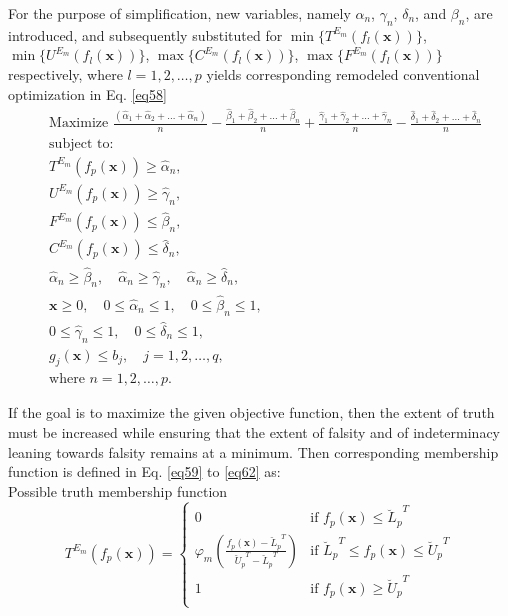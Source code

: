 \documentclass[a4paper]{elsarticle}
\begin{document}
{\begin{equation}
\end{equation}
For the purpose of simplification, new variables, namely $\alpha_n$, $\gamma_n$, $\delta_n$, and $\beta_n$, are introduced, and subsequently substituted for $\min\{T^{E_m}(f_l{(\mathbf{x})})\}$, $\min\{U^{E_m}(f_l{(\mathbf{x})})\}$, $\max\{C^{E_m}(f_l{(\mathbf{x})})\}$, $\max\{F^{E_m}(f_l{(\mathbf{x})})\}$  respectively, where $l=1,2,\ldots, p$ yields corresponding remodeled conventional optimization in Eq. \ref{eq58}
\begin{equation}
\label{eq58}
\begin{aligned}
&\text{Maximize } \frac{(\hat{\alpha}_1+\hat{\alpha}_2+\ldots+\hat{\alpha}_n)}{n}-\frac{\hat{\beta}_1+\hat{\beta}_2+\ldots+\hat{\beta}_n}{n}+\frac{\hat{\gamma}_1+\hat{\gamma}_2+\ldots+\hat{\gamma}_n}{n}-\frac{\hat{\delta}_1+\hat{\delta}_2+\ldots+\hat{\delta}_n}{n} \\
&\text{subject to:} \\
&T^{E_m}(f_p(\mathbf{x}))\geq \hat{\alpha}_n, \\
&U^{E_m}(f_p(\mathbf{x}))\geq \hat{\gamma}_n, \\
&F^{E_m}(f_p(\mathbf{x}))\leq \hat{\beta}_n, \\
&C^{E_m}(f_p(\mathbf{x}))\leq \hat{\delta}_n, \\
&\hat{\alpha}_n\geq \hat{\beta}_n, \quad \hat{\alpha}_n\geq\hat{\gamma}_n, \quad \hat{\alpha}_n\geq \hat{\delta}_n, \\
&\mathbf{x} \geq 0, \quad 0 \leq \hat{\alpha}_n \leq 1, \quad 0\leq \hat{\beta}_n \leq 1, \\
&0\leq \hat{\gamma}_n \leq 1, \quad 0\leq \hat{\delta}_n \leq 1, \\
&{g}_j(\mathbf{x})\leq {b}_{j}, \quad j=1,2,\ldots, q, \\
&\text{where } n=1,2,\ldots,p.
\end{aligned}
\end{equation}


\noindent If the goal is to maximize the given objective function, then the extent of truth must be increased while ensuring that the extent of falsity and of indeterminacy leaning towards falsity remains at a minimum. Then corresponding membership function is defined in Eq. \ref{eq59} to \ref{eq62} as:\\
Possible truth membership function
\begin{equation}
\label{eq59}
{T^{E_m}}(f_p(\mathbf{x}))=
\left\{
\begin{array}{ll}
      0 & \text{if } f_p(\mathbf{x}) \leq {\breve{L}_p}^{T} \\
      \varphi_m\left(\frac{f_p(\mathbf{x})-{\breve{L}_p}^{T}}{{\breve{U}_p}^{T}-{\breve{L}_p}^{T}}\right) & \text{if } {\breve{L}_p}^{T} \leq f_p(\mathbf{x}) \leq {\breve{U}_p}^{T} \\
      1 & \text{if } f_p(\mathbf{x}) \geq {\breve{U}_p}^{T} \\
\end{array}
\right.
\end{equation}

}
\end{document}
